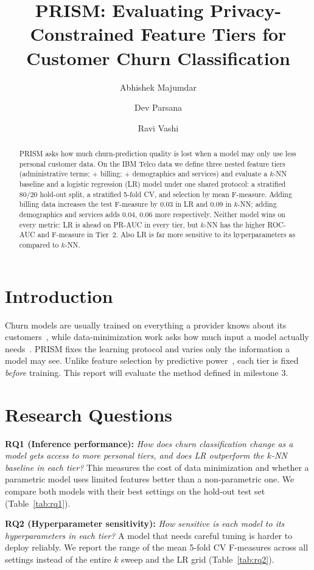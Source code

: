 \documentclass[sigconf,nonacm]{acmart}
\title{PRISM: Evaluating Privacy-Constrained Feature Tiers for Customer Churn Classification}
\author{Abhishek Majumdar}
\affiliation{\institution{University of Victoria}\city{Victoria}\country{Canada}}
\author{Dev Parsana}
\affiliation{\institution{University of Victoria}\city{Victoria}\country{Canada}}
\author{Ravi Vashi}
\affiliation{\institution{University of Victoria}\city{Victoria}\country{Canada}}
\begin{document}
\begin{abstract}
PRISM asks how much churn-prediction quality is lost when a model may only use less personal customer data. On the IBM Telco data we define three nested feature tiers (administrative terms; + billing; + demographics and services) and evaluate a $k$-NN baseline and a logistic regression (LR) model under one shared protocol: a stratified 80/20 hold-out split, a stratified 5-fold CV, and selection by mean F-measure. Adding billing data increases the test F-measure by 0.03 in LR and 0.09 in $k$-NN; adding demographics and services adds 0.04, 0.06 more respectively. Neither model wins on every metric: LR is ahead on PR-AUC in every tier, but $k$-NN has the higher ROC-AUC and F-measure in Tier~2. Also LR is far more sensitive to its hyperparameters as compared to $k$-NN.
\end{abstract}
\maketitle

\section{Introduction}
Churn models are usually trained on everything a provider knows about its customers~\cite{mozer,neslin}, while data-minimization work asks how much input a model actually needs~\cite{goldsteen}. PRISM fixes the learning protocol and varies only the information a model may see. Unlike feature selection by predictive power~\cite{omari}, each tier is fixed \emph{before} training. This report will evaluate the method defined in milestone 3.

\section{Research Questions}
\textbf{RQ1 (Inference performance):} \emph{How does churn classification change as a model gets access to more personal tiers, and does LR outperform the $k$-NN baseline in each tier?} This measures the cost of data minimization and whether a parametric model uses limited features better than a non-parametric one. We compare both models with their best settings on the hold-out test set (Table~\ref{tab:rq1}).

\textbf{RQ2 (Hyperparameter sensitivity):} \emph{How sensitive is each model to its hyperparameters in each tier?} A model that needs careful tuning is harder to deploy reliably. We report the range of the mean 5-fold CV F-measures across all settings instead of the entire $k$ sweep and the LR grid (Table~\ref{tab:rq2}).
\end{document}
